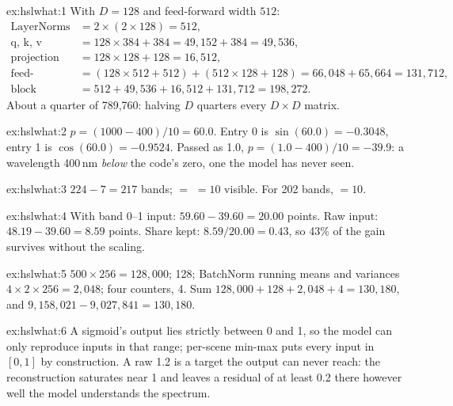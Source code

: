 
\begin{solution}{ex:hslwhat:1}
With $D=128$ and feed-forward width $512$:
\begin{align*}
\text{LayerNorms} &= 2\times(2\times128) = 512,\\
\text{q, k, v} &= 128\times384+384 = 49{,}152+384 = 49{,}536,\\
\text{projection} &= 128\times128+128 = 16{,}512,\\
\text{feed-forward} &= (128\times512+512)+(512\times128+128) = 66{,}048+65{,}664 = 131{,}712,\\
\text{block} &= 512+49{,}536+16{,}512+131{,}712 = 198{,}272 .
\end{align*}
About a quarter of 789,760: halving $D$ quarters every $D\times D$ matrix.
\end{solution}

\begin{solution}{ex:hslwhat:2}
$p=(1000-400)/10=60.0$. Entry 0 is $\sin(60.0)=-0.3048$, entry 1 is $\cos(60.0)=-0.9524$. Passed as 1.0,
$p=(1.0-400)/10=-39.9$: a wavelength 400\,nm \emph{below} the code's zero, one the model has never seen.
\end{solution}

\begin{solution}{ex:hslwhat:3}
$224-7=217$ bands;  $=$  $=10$ visible. For 202 bands,
 $=10$.
\end{solution}

\begin{solution}{ex:hslwhat:4}
With band 0--1 input: $59.60-39.60=20.00$ points. Raw input: $48.19-39.60=8.59$ points. Share kept:
$8.59/20.00=0.43$, so 43\% of the gain survives without the scaling.
\end{solution}

\begin{solution}{ex:hslwhat:5}
 $500\times256=128{,}000$;  128; BatchNorm running means and variances
$4\times2\times256=2{,}048$; four  counters, 4. Sum
$128{,}000+128+2{,}048+4=130{,}180$, and $9{,}158{,}021-9{,}027{,}841=130{,}180$.
\end{solution}

\begin{solution}{ex:hslwhat:6}
A sigmoid's output lies strictly between 0 and 1, so the model can only reproduce inputs in that range; per-scene
min-max puts every input in $[0,1]$ by construction. A raw 1.2 is a target the output can never reach: the
reconstruction saturates near 1 and leaves a residual of at least 0.2 there however well the model understands the
spectrum.
\end{solution}
